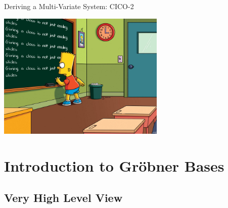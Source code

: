 \documentclass[aspectratio=169]{beamer}
\begin{document}
\begin{frame}{Deriving a Multi-Variate System: CICO-2}
  \vfill

  \begin{center}
    \includegraphics[width=8cm]{./figures/simpsons}
  \end{center}
  
  \vfill
\end{frame}


\section{Introduction to Gröbner Bases}

\subsection{Very High Level View}
\end{document}
